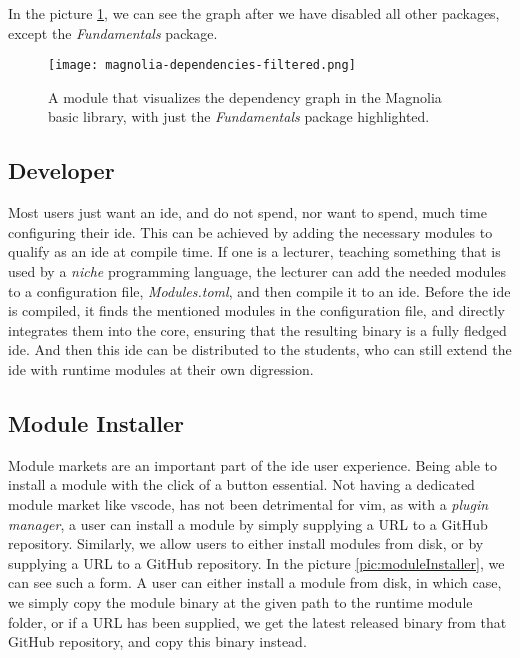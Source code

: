 In the picture \ref{pic:depDis}, we can see the graph after we have disabled all
other packages, except the \textit{Fundamentals} package.

\begin{figure}[H]
  \centering
  \texttt{[image: magnolia-dependencies-filtered.png]}
  \caption{
    A module that visualizes the dependency graph in the Magnolia basic library,
    with just the \textit{Fundamentals} package highlighted.
  }
  \label{pic:depDis}
\end{figure}


\subsection{Developer}

Most users just want an \gls*{ide}, and do not spend, nor want to spend, much
time configuring their \gls*{ide}. This can be achieved by adding the necessary
modules to qualify as an \gls*{ide} at compile time. If one is a lecturer,
teaching something that is used by a \textit{niche} programming language, the
lecturer can add the needed modules to a configuration file,
\textit{Modules.toml}, and then compile it to an \gls*{ide}. Before the \gls*{ide}
is compiled, it finds the mentioned modules in the configuration file, and
directly integrates them into the core, ensuring that the resulting binary is a
fully fledged \gls*{ide}. And then this \gls*{ide} can be distributed to the
students, who can still extend the \gls*{ide} with runtime modules at their own
digression.

\subsection{Module Installer}

Module markets are an important part of the \gls*{ide} user experience. Being
able to install a module with the click of a button essential. Not having a
dedicated module market like \gls*{vscode}, has not been detrimental for
\gls*{vim}, as with a \textit{plugin manager}, a user can install a module by
simply supplying a URL to a GitHub repository. Similarly, we allow users to
either install modules from disk, or by supplying a URL to a GitHub repository.
In the picture \ref{pic:moduleInstaller}, we can see such a form. A user can
either install a module from disk, in which case, we simply copy the module
binary at the given path to the runtime module folder, or if a URL has been
supplied, we get the latest released binary from that GitHub repository, and
copy this binary instead.

